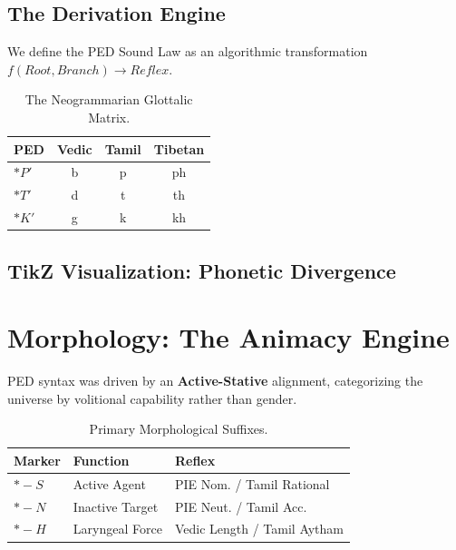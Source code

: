 \documentclass[11pt,twocolumn,letterpaper]{article}
\begin{document}
\subsection{The Derivation Engine}
We define the PED Sound Law as an algorithmic transformation $f(Root, Branch) \rightarrow Reflex$.

\begin{table}[h]
\centering
\small
\begin{tabular}{@{}lccc@{}}
\toprule
\textbf{PED} & \textbf{Vedic} & \textbf{Tamil} & \textbf{Tibetan} \\ \midrule
$*P'$ & b & p & ph \\
$*T'$ & d & t & th \\
$*K'$ & g & k & kh \\ \bottomrule
\end{tabular}
\caption{The Neogrammarian Glottalic Matrix.}
\end{table}

\subsection{TikZ Visualization: Phonetic Divergence}
\begin{center}
\end{center}

\section{Morphology: The Animacy Engine}
PED syntax was driven by an \textbf{Active-Stative} alignment, categorizing the universe by volitional capability rather than gender.

\begin{table}[h]
\centering
\small
\begin{tabularx}{\columnwidth}{@{}lXX@{}}
\toprule
\textbf{Marker} & \textbf{Function} & \textbf{Reflex} \\ \midrule
$*-S$ & Active Agent & PIE Nom. / Tamil Rational \\
$*-N$ & Inactive Target & PIE Neut. / Tamil Acc. \\
$*-H$ & Laryngeal Force & Vedic Length / Tamil Aytham \\ \bottomrule
\end{tabularx}
\caption{Primary Morphological Suffixes.}
\end{table}
\end{document}
